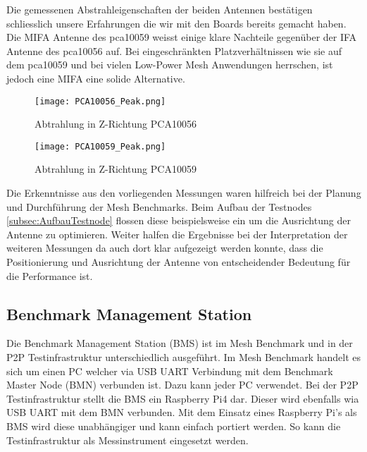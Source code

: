 Die gemessenen Abstrahleigenschaften der beiden Antennen bestätigen schliesslich unsere Erfahrungen die wir mit den Boards bereits gemacht haben. Die MIFA Antenne des pca10059 weisst einige klare Nachteile gegenüber der IFA Antenne des pca10056 auf. Bei eingeschränkten Platzverhältnissen wie sie auf dem pca10059 und bei vielen Low-Power Mesh Anwendungen herrschen, ist jedoch eine MIFA eine solide Alternative.

\begin{figure}[!htbp]
\centering
\begin{minipage}[b]{0.49\linewidth}
	\centering
	\texttt{[image: PCA10056\_Peak.png]}
	\caption{Abtrahlung in Z-Richtung PCA10056}
	\label{fig:PCA10056Peak}
\end{minipage}
\begin{minipage}[b]{0.49\linewidth}
	\centering
	\texttt{[image: PCA10059\_Peak.png]}
	\caption{Abtrahlung in Z-Richtung PCA10059}
	\label{fig:PCA10059Peak}
\end{minipage}
\end{figure}


Die Erkenntnisse aus den vorliegenden Messungen waren hilfreich bei der Planung und Durchführung der Mesh Benchmarks. Beim Aufbau der Testnodes \ref{subsec:AufbauTestnode} flossen diese beispielsweise ein um die Ausrichtung der Antenne zu optimieren. Weiter halfen die Ergebnisse bei der Interpretation der weiteren Messungen da auch dort klar aufgezeigt werden konnte, dass die Positionierung und Ausrichtung der Antenne von entscheidender Bedeutung für die Performance ist.

\subsection{Benchmark Management Station}\label{subsec:BenchmarkManagementStation}

Die Benchmark Management Station (BMS) ist im Mesh Benchmark und in der P2P Testinfrastruktur unterschiedlich ausgeführt. Im Mesh Benchmark handelt es sich um einen PC welcher via USB UART Verbindung mit dem Benchmark Master Node (BMN) verbunden ist. Dazu kann jeder PC verwendet.
Bei der P2P Testinfrastruktur stellt die BMS ein Raspberry Pi4 dar. Dieser wird ebenfalls wia USB UART mit dem BMN verbunden. Mit dem Einsatz eines Raspberry Pi's als BMS wird diese unabhängiger und kann einfach portiert werden. So kann die Testinfrastruktur als Messinstrument eingesetzt werden.
